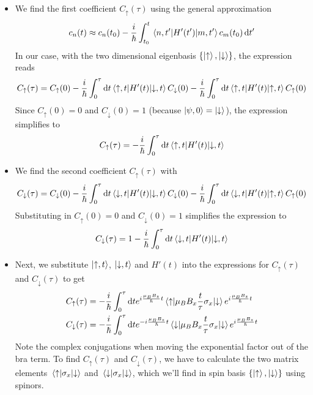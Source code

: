 \documentclass[11pt, a4paper]{article}
\newcommand{\diff}{\mathop{}\!\mathrm{d}} %
\newcommand{\p}{\psi}  %
\newcommand{\ua}{\uparrow}  %
\newcommand{\da}{\downarrow}  %
\begin{document}
\begin{itemize}
	\item We find the first coefficient $ C_{\ua}(\tau) $ using the general approximation
	\begin{equation*}
		c_{n}(t) \approx c_{n}(t_{0}) - \frac{i}{\hbar}\int_{t_{0}}^{t}\mel{n, t'}{H'(t')}{m, t'}c_{m}(t_{0}) \diff t'
	\end{equation*}
	In our case, with the two dimensional eigenbasis $ \{\ket{\ua}, \ket{\da}\} $, the expression reads
	\begin{equation*}
		C_{\ua}(\tau) = C_{\ua}(0) - \frac{i}{\hbar}\int_{0}^{\tau}\diff t \mel{\ua, t}{H'(t)}{\da, t}C_{\da}(0) - \frac{i}{\hbar}\int_{0}^{\tau}\diff t \mel{\ua, t}{H'(t)}{\ua, t}C_{\ua}(0)
	\end{equation*}
	Since $ C_{\ua}(0) = 0 $ and $ C_{\da}(0) = 1 $ (because $ \ket{\p, 0} = \ket{\da} $), the expression simplifies to
	\begin{equation*}
		C_{\ua}(\tau) = - \frac{i}{\hbar}\int_{0}^{\tau}\diff t \mel{\ua, t}{H'(t)}{\da, t}
	\end{equation*}

	\item We find the second coefficient $ C_{\ua}(\tau) $ with
	\begin{equation*}
		C_{\da}(\tau) = C_{\da}(0) - \frac{i}{\hbar}\int_{0}^{\tau}\diff t \mel{\da, t}{H'(t)}{\da, t}C_{\da}(0) - \frac{i}{\hbar}\int_{0}^{\tau}\diff t \mel{\da, t}{H'(t)}{\ua, t}C_{\ua}(0)
	\end{equation*}
	Substituting in $ C_{\ua}(0) = 0 $ and $ C_{\da}(0) = 1 $ simplifies the expression to
	\begin{equation*}
		C_{\da}(\tau) = 1 - \frac{i}{\hbar}\int_{0}^{\tau}\diff t \mel{\da, t}{H'(t)}{\da, t}
	\end{equation*}
	
	\item Next, we substitute $ \ket{\ua, t} $, $ \ket{\da, t} $ and $ H'(t) $ into the expressions for $ C_{\ua}(\tau) $ and $ C_{\da}(\tau) $ to get
	\begin{align*}
		& C_{\ua}(\tau) = - \frac{i}{\hbar}\int_{0}^{\tau} \diff t e^{i\frac{\mu_{B}B_{z}}{\hbar}t}\mel{\ua}{\mu_{B}B_{x}\frac{t}{\tau}\sigma_{x}}{\da} e^{i\frac{\mu_{B}B_{z}}{\hbar}t}\\
		& C_{\da}(\tau) = - \frac{i}{\hbar}\int_{0}^{\tau} \diff t e^{-i\frac{\mu_{B}B_{z}}{\hbar}t}\mel{\da}{\mu_{B}B_{x}\frac{t}{\tau}\sigma_{x}}{\da} e^{i\frac{\mu_{B}B_{z}}{\hbar}t}
	\end{align*}
	Note the complex conjugations when moving the exponential factor out of the bra term. To find $ C_{\ua}(\tau) $ and $ C_{\da}(\tau) $, we have to calculate the two matrix elements $ \mel{\ua}{\sigma_{x}}{\da} $ and $ \mel{\da}{\sigma_{x}}{\da} $, which we'll find in spin basis $ \{\ket{\ua}, \ket{\da} \} $ using spinors.
	

\end{itemize}
\end{document}

